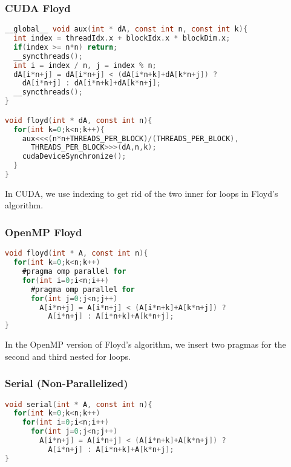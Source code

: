 \documentclass[12pt]{article}
\begin{document}
\subsubsection*{CUDA Floyd}
\begin{lstlisting}[frame=single,language=C,caption=CUDA Floyd \label{code:make}]
__global__ void aux(int * dA, const int n, const int k){
  int index = threadIdx.x + blockIdx.x * blockDim.x;
  if(index >= n*n) return;
  __syncthreads();
  int i = index / n, j = index % n;
  dA[i*n+j] = dA[i*n+j] < (dA[i*n+k]+dA[k*n+j]) ? 
    dA[i*n+j] : dA[i*n+k]+dA[k*n+j];
  __syncthreads();
}

void floyd(int * dA, const int n){
  for(int k=0;k<n;k++){
    aux<<<(n*n+THREADS_PER_BLOCK)/(THREADS_PER_BLOCK),
      THREADS_PER_BLOCK>>>(dA,n,k);
    cudaDeviceSynchronize();
  }
}
\end{lstlisting}
In CUDA, we use indexing to get rid of the two inner for loops in Floyd's algorithm.

\subsubsection*{OpenMP Floyd}
\begin{lstlisting}[frame=single,language=C,caption=OpenMP Floyd \label{code:make}]
void floyd(int * A, const int n){
  for(int k=0;k<n;k++)
    #pragma omp parallel for
    for(int i=0;i<n;i++)
      #pragma omp parallel for
      for(int j=0;j<n;j++)
        A[i*n+j] = A[i*n+j] < (A[i*n+k]+A[k*n+j]) ? 
          A[i*n+j] : A[i*n+k]+A[k*n+j];
}
\end{lstlisting}
In the OpenMP version of Floyd's algorithm, we insert two pragmas for the second and
third nested for loops.

\subsubsection*{Serial (Non-Parallelized)}
\begin{lstlisting}[frame=single,language=C,caption=Serial Floyd \label{code:make}]
void serial(int * A, const int n){
  for(int k=0;k<n;k++)
    for(int i=0;i<n;i++)
      for(int j=0;j<n;j++)
        A[i*n+j] = A[i*n+j] < (A[i*n+k]+A[k*n+j]) ? 
          A[i*n+j] : A[i*n+k]+A[k*n+j];
}
\end{lstlisting}

\newpage
\end{document}

